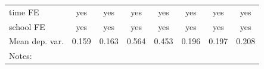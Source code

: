 \documentclass[12pt]{article}
\theoremstyle{plain}
\theoremstyle{plain}
\theoremstyle{plain}
\theoremstyle{definition}
\theoremstyle{plain}
\theoremstyle{definition}
\theoremstyle{plain}
\theoremstyle{remark}
\theoremstyle{definition}
\theoremstyle{definition}
\theoremstyle{plain}
\begin{document}
\begin{table}[H]
{\begin{tabular}{p{12.39em}lllllll}
			\multicolumn{1}{l}{time FE} & \multicolumn{1}{c}{yes} & \multicolumn{1}{c}{yes} & \multicolumn{1}{c}{yes} & \multicolumn{1}{c}{yes} & \multicolumn{1}{c}{yes} & \multicolumn{1}{c}{yes} & \multicolumn{1}{c}{yes} \\
			\multicolumn{1}{l}{school FE} & \multicolumn{1}{c}{yes} & \multicolumn{1}{c}{yes} & \multicolumn{1}{c}{yes} & \multicolumn{1}{c}{yes} & \multicolumn{1}{c}{yes} & \multicolumn{1}{c}{yes} & \multicolumn{1}{c}{yes} \\
			\multicolumn{1}{l}{Mean dep. var.} & \multicolumn{1}{c}{0.159} & \multicolumn{1}{c}{0.163} & \multicolumn{1}{c}{0.564} & \multicolumn{1}{c}{0.453} & \multicolumn{1}{c}{0.196} & \multicolumn{1}{c}{0.197} & \multicolumn{1}{c}{0.208} \\
			\midrule
			\multicolumn{8}{p{52.5em}}{Notes:} \\
		\end{tabular}%
		
	}
\end{table}
\end{document}
